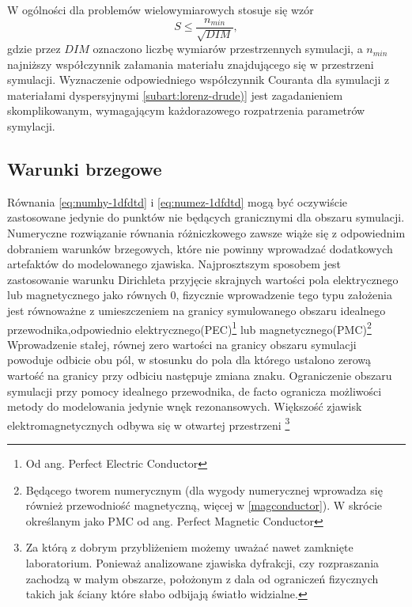 W ogólności dla problemów wielowymiarowych stosuje się wzór
\begin{equation}
S\le\frac{n_{min}}{\sqrt{DIM}},
\label{eq:courant}
\end{equation}
gdzie przez $DIM$ oznaczono liczbę wymiarów przestrzennych symulacji, a $n_{min}$ najniższy współczynnik załamania materiału znajdującego się w przestrzeni symulacji. Wyznaczenie odpowiedniego współczynnik Couranta dla symulacji z materiałami dyspersyjnymi \ref{subart:lorenz-drude)} jest zagadanieniem skomplikowanym, wymagającym każdorazowego rozpatrzenia parametrów symylacji.


\subsection{Warunki brzegowe}
Równania \ref{eq:numhy-1dfdtd} i \ref{eq:numez-1dfdtd} mogą być oczywiście zastosowane jedynie do punktów nie będących granicznymi dla obszaru symulacji. Numeryczne rozwiązanie równania różniczkowego zawsze wiąże się z odpowiednim dobraniem warunków brzegowych, które nie powinny wprowadzać dodatkowych artefaktów do modelowanego zjawiska. Najprosztszym sposobem jest zastosowanie warunku Dirichleta przyjęcie skrajnych wartości pola elektrycznego lub magnetycznego jako równych 0, fizycznie wprowadzenie tego typu założenia jest równoważne z umieszczeniem na granicy symulowanego obszaru idealnego przewodnika,odpowiednio elektrycznego(PEC)\footnote{Od ang. Perfect Electric Conductor} lub magnetycznego(PMC)\footnote{Będącego tworem numerycznym (dla wygody numerycznej wprowadza się również przewodniość magnetyczną, więcej w \ref{magconductor}). W skrócie określanym jako PMC od ang. Perfect Magnetic Conductor} Wprowadzenie stałej, równej zero wartości na granicy obszaru symulacji powoduje odbicie obu pól, w stosunku do pola dla którego ustalono zerową wartość na granicy przy odbiciu następuje zmiana znaku. Ograniczenie obszaru symulacji przy pomocy idealnego przewodnika, de facto ogranicza możliwości metody do modelowania jedynie wnęk rezonansowych. Większość zjawisk elektromagnetycznych odbywa się w otwartej przestrzeni \footnote{Za którą z dobrym przybliżeniem możemy uważać nawet zamknięte laboratorium. Ponieważ analizowane zjawiska dyfrakcji, czy rozpraszania zachodzą w małym obszarze, położonym z dala od ograniczeń fizycznych takich jak ściany które słabo odbijają światło widzialne.}

